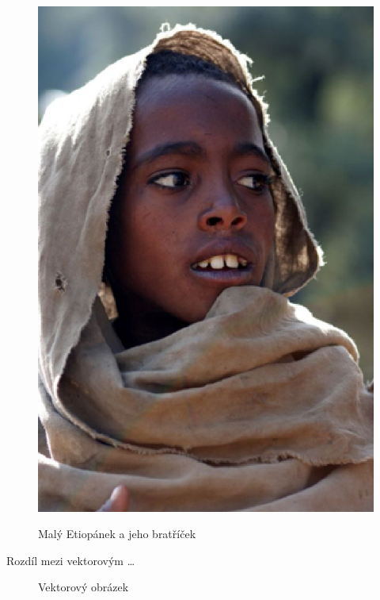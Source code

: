 \documentclass[11pt, a4paper]{article}
\begin{document}
\begin{figure}[h]
\begin{center}
{{            \includegraphics{etiopan.eps}
        }
        
    }
    \caption{Malý Etiopánek a jeho bratříček}
    \label{etiopan}
    \end{center}
    \end{figure}
    \pagebreak
    
    Rozdíl mezi vektorovým \dots
    \begin{figure}[h]
        \begin{center}
        \caption{Vektorový obrázek}
        \label{onisan}
        \end{center}
    \end{figure}
    
\end{document}

